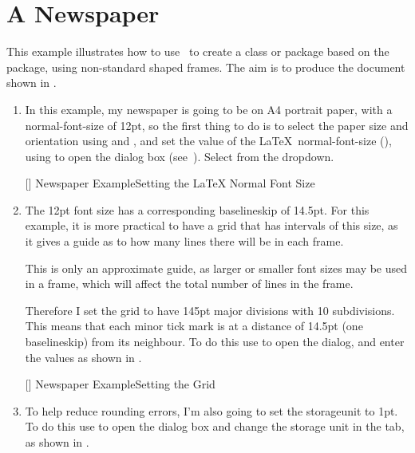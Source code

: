 \section{A Newspaper}\label{sec:newstutorial}

This example illustrates how to use \FlowframTk\ to create a
class or package based on the  package, using non-standard
shaped frames. The aim is to produce the document shown in
.

\begin{enumerate}
\item In this example, my newspaper is going to be on A4 portrait
paper, with a \gls{normal-font-size} of 12\gls{pt}, so the first
thing to do is to select the paper size and orientation using
 and
, and set the value of the
\LaTeX\ \gls{normal-font-size} (), using
 to open the  dialog box
(see~). Select  from the
\gls{dropdown}.

[]
{}
{Newspaper Example\dash Setting the \LaTeX{} Normal Font Size}

\item The 12pt font size has a corresponding \gls{baselineskip}
of 14.5pt. For this example, it is more practical to have a grid
that has intervals of this size, as it gives a guide as to how many
lines there will be in each frame.

\begin{information}
This is only an approximate guide, as larger or smaller font sizes may be
used in a frame, which will affect the total number of lines in the
frame. 
\end{information}

Therefore I set the grid to have 145\gls{pt} major divisions with
10 subdivisions. This means that each minor tick mark is at a distance
of 14.5pt (one \gls{baselineskip}) from its neighbour. To do this
use  to open the  dialog, and enter the
values as shown in .

[]
{}
{Newspaper Example\dash Setting the Grid}

\item To help reduce rounding errors, I'm also going to set the
\gls{storageunit} to 1pt. To do this use  to
open the  dialog box and change the storage unit in
the  tab, as shown in
.


\end{enumerate}
